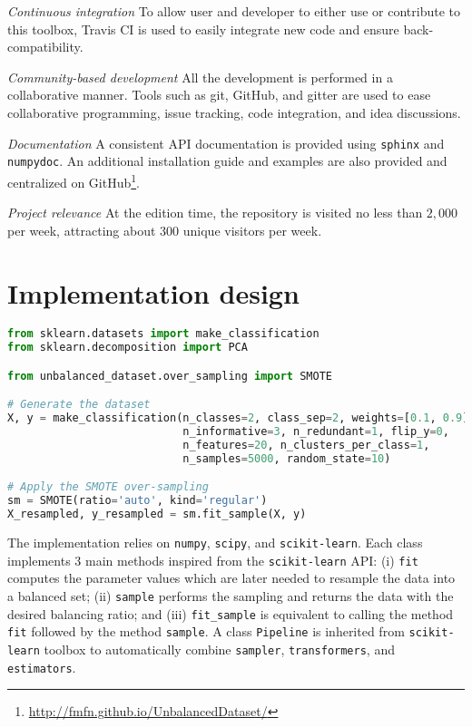 \documentclass[twoside,11pt]{article}
\begin{document}
\noindent\textit{Continuous integration} To allow user and developer to either use or contribute to this toolbox, Travis CI is used to easily integrate new code and ensure back-compatibility.

\noindent\textit{Community-based development} All the development is performed in a collaborative manner.
Tools such as git, GitHub, and gitter are used to ease collaborative programming, issue tracking, code integration, and idea discussions.

\noindent\textit{Documentation} A consistent API documentation is provided using \texttt{sphinx} and \texttt{numpydoc}.
An additional installation guide and examples are also provided and centralized on GitHub\footnote{\url{http://fmfn.github.io/UnbalancedDataset/}}.

\noindent\textit{Project relevance} At the edition time, the repository is visited no less than $2,000$ per week, attracting about $300$ unique visitors per week.

\section{Implementation design}

\begin{lstlisting}[language=Python, caption=Code snippet to over-sample a dataset using SMOTE.]
from sklearn.datasets import make_classification
from sklearn.decomposition import PCA

from unbalanced_dataset.over_sampling import SMOTE

# Generate the dataset
X, y = make_classification(n_classes=2, class_sep=2, weights=[0.1, 0.9],
                           n_informative=3, n_redundant=1, flip_y=0,
                           n_features=20, n_clusters_per_class=1,
                           n_samples=5000, random_state=10)

# Apply the SMOTE over-sampling
sm = SMOTE(ratio='auto', kind='regular')
X_resampled, y_resampled = sm.fit_sample(X, y)
\end{lstlisting}

The implementation relies on \texttt{numpy}, \texttt{scipy}, and \texttt{scikit-learn}.
Each class implements 3 main methods inspired from the \texttt{scikit-learn} API:
(i) \texttt{fit} computes the parameter values which are later needed to resample the data into a balanced set;
(ii) \texttt{sample} performs the sampling and returns the data with the desired balancing ratio;
and (iii) \texttt{fit\_sample} is equivalent to calling the method \texttt{fit} followed by the method \texttt{sample}.
A class \texttt{Pipeline} is inherited from \texttt{scikit-learn} toolbox to automatically combine \texttt{sampler}, \texttt{transformers}, and \texttt{estimators}.
\end{document}
